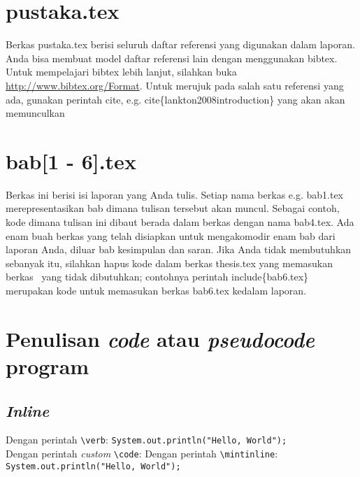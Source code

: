 \section{pustaka.tex}
Berkas pustaka.tex berisi seluruh daftar referensi yang digunakan dalam 
laporan. 
Anda bisa membuat model daftar referensi lain dengan menggunakan bibtex.
Untuk mempelajari bibtex lebih lanjut, silahkan buka 
\url{http://www.bibtex.org/Format}. 
Untuk merujuk pada salah satu referensi yang ada, gunakan perintah \bslash 
cite, e.g. \bslash cite\{lankton2008introduction\} yang akan akan memunculkan 
\cite{lankton2008introduction}


\section{bab[1 - 6].tex}
Berkas ini berisi isi laporan yang Anda tulis. 
Setiap nama berkas e.g. bab1.tex merepresentasikan bab dimana tulisan tersebut 
akan muncul. 
Sebagai contoh, kode dimana tulisan ini dibaut berada dalam berkas dengan nama 
bab4.tex. 
Ada enam buah berkas yang telah disiapkan untuk mengakomodir enam bab dari 
laporan Anda, diluar bab kesimpulan dan saran. 
Jika Anda tidak membutuhkan sebanyak itu, silahkan hapus kode dalam berkas 
thesis.tex yang memasukan berkas \latex~yang tidak dibutuhkan;  contohnya 
perintah \bslash include\{bab6.tex\} merupakan kode untuk memasukan berkas 
bab6.tex kedalam laporan.

\section{Penulisan \textit{code} atau \textit{pseudocode} program}

\subsection{\textit{Inline}}

Dengan perintah \verb|\verb|: \verb|System.out.println("Hello, World");| \\
Dengan perintah \textit{custom} \verb|\code|: 
Dengan perintah \verb|\mintinline|: \texttt{System.out.println("Hello, World"); }

